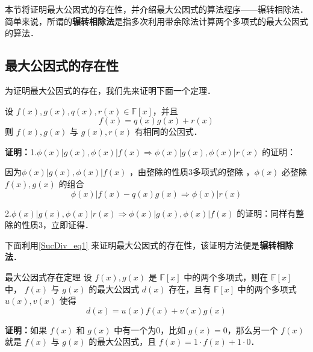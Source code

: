 
\begin{issues}
\end{issues}

本节将证明最大公因式的存在性，并介绍最大公因式的算法程序——辗转相除法．简单来说，所谓的\textbf{辗转相除法}是指多次利用带余除法计算两个多项式的最大公因式的算法．
\subsection{最大公因式的存在性}
为证明最大公因式的存在，我们先来证明下面一个定理．
\begin{theorem}{}\label{SucDiv_the1}
设 $f(x),g(x),q(x),r(x)\in\mathbb{F}[x]$，并且
\begin{equation}\label{SucDiv_eq1}
f(x)=q(x)g(x)+r(x)
\end{equation}
则 $f(x),g(x)$ 与 $g(x),r(x)$ 有相同的公因式．
\end{theorem}
\textbf{证明：}1.$\phi(x)|g(x),\phi(x)|f(x)\Rightarrow \phi(x)|g(x),\phi(x)|r(x)$ 的证明：

因为$\phi(x)|g(x),\phi(x)|f(x)$ ，由整除的性质3多项式的整除 ，$\phi(x)$ 必整除 $f(x),g(x)$ 的组合
\begin{equation}
\phi(x)|f(x)-q(x)g(x)\Rightarrow \phi(x)|r(x)
\end{equation}

2.$\phi(x)|g(x),\phi(x)|r(x)\Rightarrow\phi(x)|g(x),\phi(x)|f(x)$ 的证明：同样有整除的性质3，立即证得．

下面利用\autoref{SucDiv_eq1} 来证明最大公因式的存在性，该证明方法便是\textbf{辗转相除法}．
\begin{theorem}{最大公因式存在定理}\label{SucDiv_the2}
设 $f(x),g(x)$ 是 $\mathbb{F}[x]$ 中的两个多项式，则在 $\mathbb{F}[x]$ 中， $f(x)$ 与 $g(x)$ 的最大公因式 $d(x)$ 存在，且有 $\mathbb{F}[x]$ 中的两个多项式 $u(x),v(x)$ 使得
\begin{equation}\label{SucDiv_eq2}
d(x)=u(x)f(x)+v(x)g(x)
\end{equation}

\end{theorem}
\textbf{证明：}如果 $f(x)$ 和 $g(x)$ 中有一个为0，比如 $g(x)=0$，那么另一个 $f(x)$ 就是 $f(x)$ 与 $g(x)$ 的最大公因式，且 $f(x)=1\cdot f(x)+1\cdot0$．

